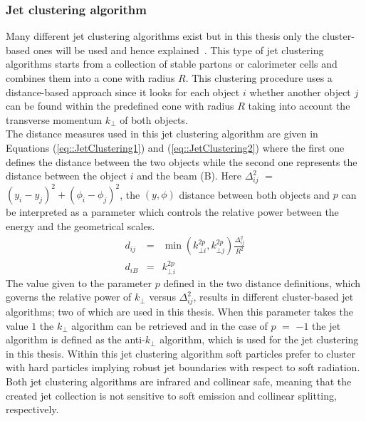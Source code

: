 \subsubsection*{Jet clustering algorithm}
Many different jet clustering algorithms exist but in this thesis only the cluster-based ones will be used and hence explained~\cite{AntiKT}. This type of jet clustering algorithms starts from a collection of stable partons or calorimeter cells and combines them into a cone with radius $R$. This clustering procedure uses a distance-based approach since it looks for each object $i$ whether another object $j$ can be found within the predefined cone with radius $R$ taking into account the transverse momentum $k_{\bot}$ of both objects.
\\
The distance measures used in this jet clustering algorithm are given in Equations (\ref{eq::JetClustering1}) and (\ref{eq::JetClustering2}) where the first one defines the distance between the two objects while the second one represents the distance between the object $i$ and the beam (B). Here $\Delta_{ij}^{2}$ $=$ $(y_i - y_j)^{2} + (\phi_i - \phi_j)^2$, the $(y,\phi)$ distance between both objects and $p$ can be interpreted as a parameter which controls the relative power between the energy and the geometrical scales.
\\
\begin{eqnarray}
 d_{ij} & = & \min(k_{\bot i}^{2p}, k_{\bot j}^{2p}) \frac{\Delta_{ij}^{2}}{R^{2}} \label{eq::JetClustering1} \\
 d_{iB} & = & k_{\bot i}^{2p}                                                      \label{eq::JetClustering2}
\end{eqnarray}
The value given to the parameter $p$ defined in the two distance definitions, which governs the relative power of $k_{\bot}$ versus $\Delta_{ij}^{2}$, results in different cluster-based jet algorithms; two of which are used in this thesis. When this parameter takes the value $1$ the $k_{\bot}$ algorithm can be retrieved and in the case of $p$ $=$ $-1$ the jet algorithm is defined as the anti-$k_{\bot}$ algorithm, which is used for the jet clustering in this thesis. %
Within this jet clustering algorithm soft particles prefer to cluster with hard particles implying robust jet boundaries with respect to soft radiation. Both jet clustering algorithms are infrared and collinear safe, meaning that the created jet collection is not sensitive to soft emission and collinear splitting, respectively.
\\

